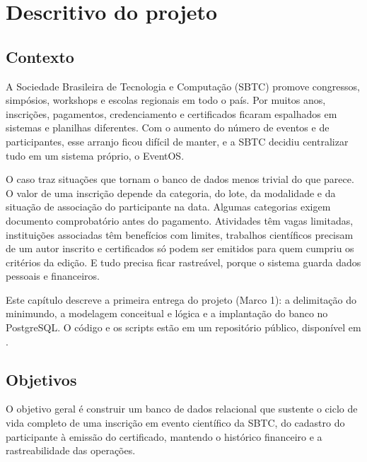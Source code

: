 \section{Descritivo do projeto}
\label{sec:descritivo}

\subsection{Contexto}

A Sociedade Brasileira de Tecnologia e Computação (SBTC) promove congressos, simpósios, workshops e escolas regionais em todo o país. Por muitos anos, inscrições, pagamentos, credenciamento e certificados ficaram espalhados em sistemas e planilhas diferentes. Com o aumento do número de eventos e de participantes, esse arranjo ficou difícil de manter, e a SBTC decidiu centralizar tudo em um sistema próprio, o EventOS.

O caso traz situações que tornam o banco de dados menos trivial do que parece. O valor de uma inscrição depende da categoria, do lote, da modalidade e da situação de associação do participante na data. Algumas categorias exigem documento comprobatório antes do pagamento. Atividades têm vagas limitadas, instituições associadas têm benefícios com limites, trabalhos científicos precisam de um autor inscrito e certificados só podem ser emitidos para quem cumpriu os critérios da edição. E tudo precisa ficar rastreável, porque o sistema guarda dados pessoais e financeiros.

Este capítulo descreve a primeira entrega do projeto (Marco 1): a delimitação do minimundo, a modelagem conceitual e lógica e a implantação do banco no PostgreSQL. O código e os scripts estão em um repositório público, disponível em
\repo.

\subsection{Objetivos}

O objetivo geral é construir um banco de dados relacional que sustente o ciclo de vida completo de uma inscrição em evento científico da SBTC, do cadastro do participante à emissão do certificado, mantendo o histórico financeiro e a rastreabilidade das operações.

